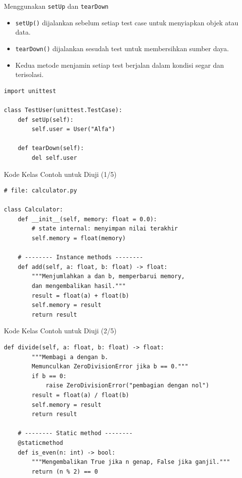 \documentclass[aspectratio=169, table]{beamer}
\begin{document}
\begin{frame}[fragile]{Menggunakan \texttt{setUp} dan \texttt{tearDown}}
\vspace*{10pt}
\begin{itemize}
  \item \texttt{setUp()} dijalankan sebelum setiap test case untuk menyiapkan objek atau data.
  \item \texttt{tearDown()} dijalankan sesudah test untuk membersihkan sumber daya.
  \item Kedua metode menjamin setiap test berjalan dalam kondisi segar dan terisolasi.
\end{itemize}

\begin{lstlisting}[style=PythonStyle, caption={Contoh penggunaan setUp/tearDown}]
import unittest

class TestUser(unittest.TestCase):
    def setUp(self):
        self.user = User("Alfa")

    def tearDown(self):
        del self.user
\end{lstlisting}
\end{frame}


\begin{frame}[fragile]{Kode Kelas Contoh untuk Diuji (1/5)}
\vspace*{20pt}
\begin{lstlisting}[style=PythonStyle]
# file: calculator.py

class Calculator:
    def __init__(self, memory: float = 0.0):
        # state internal: menyimpan nilai terakhir
        self.memory = float(memory)

    # -------- Instance methods --------
    def add(self, a: float, b: float) -> float:
        """Menjumlahkan a dan b, memperbarui memory, 
        dan mengembalikan hasil."""
        result = float(a) + float(b)
        self.memory = result
        return result
\end{lstlisting}
\end{frame}

\begin{frame}[fragile]{Kode Kelas Contoh untuk Diuji (2/5)}
\vspace*{20pt}
\begin{lstlisting}[style=PythonStyle]
    def divide(self, a: float, b: float) -> float:
        """Membagi a dengan b. 
        Memunculkan ZeroDivisionError jika b == 0."""
        if b == 0:
            raise ZeroDivisionError("pembagian dengan nol")
        result = float(a) / float(b)
        self.memory = result
        return result

    # -------- Static method --------
    @staticmethod
    def is_even(n: int) -> bool:
        """Mengembalikan True jika n genap, False jika ganjil."""
        return (n % 2) == 0
\end{lstlisting}
\end{frame}
\end{document}
